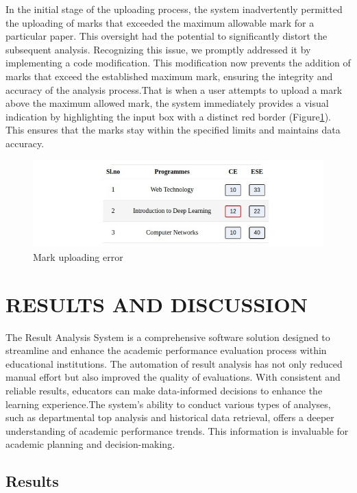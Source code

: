\documentclass{nascproject}
\begin{document}
In the initial stage of the uploading process, the system inadvertently permitted the uploading of marks that exceeded the maximum allowable mark for a particular paper. This oversight had the potential to significantly distort the subsequent analysis. Recognizing this issue, we promptly addressed it by implementing a code modification. This modification now prevents the addition of marks that exceed the established maximum mark, ensuring the integrity and accuracy of the analysis process.That is when a user attempts to upload a mark above the maximum allowed mark, the system immediately provides a visual indication by highlighting the input box with a distinct red border (Figure\ref{testing}). This ensures that the marks stay within the specified limits and maintains data accuracy.
\begin{figure}
	\centering
	\includegraphics[width=1\linewidth]{testing.jpeg}
	\caption{Mark uploading error}
	\label{testing}
\end{figure}
\chapter{RESULTS AND DISCUSSION}
The Result Analysis System is a comprehensive software solution designed to streamline and enhance the academic performance evaluation process within educational institutions. The automation of result analysis has not only reduced manual effort but also improved the quality of evaluations. With consistent and reliable results, educators can make data-informed decisions to enhance the learning experience.The system's ability to conduct various types of analyses, such as departmental top analysis and historical data retrieval, offers a deeper understanding of academic performance trends. This information is invaluable for academic planning and decision-making.
\section{Results}
\end{document}
